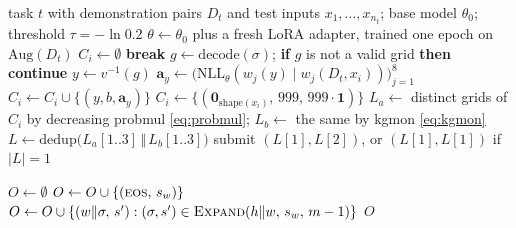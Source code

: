 \documentclass[11pt]{article}
\newcommand{\code}[1]{\texttt{#1}}
\newcommand{\R}[1]{R#1}
\begin{document}
\begin{algorithm}[t]
\caption{The NVARC-derived solver for one task, as run in our notebooks (code of \R{2}). In the code, the batches of different test inputs of a task are interleaved.}
\label{alg:solver}
\begin{algorithmic}[1]
\Require task $t$ with demonstration pairs $D_t$ and test inputs $x_1,\dots,x_{n_t}$; base model $\theta_0$; threshold $\tau=-\ln 0.2$
\State $\theta \gets \theta_0$ plus a fresh LoRA adapter, trained one epoch on $\mathrm{Aug}(D_t)$ 
  \State $C_i \gets \emptyset$ 
   
     \textbf{break} \EndIf
     
      \State $g \gets \mathrm{decode}(\sigma)$; \textbf{if} $g$ is not a valid grid \textbf{then continue}
      \State $y \gets v^{-1}(g)$ 
        \State $\mathbf{a}_y \gets \big(\mathrm{NLL}_\theta(w_j(y) \mid w_j(D_t, x_i))\big)_{j=1}^{8}$ 
      \EndIf
      \State $C_i \gets C_i \cup \{(y, b, \mathbf{a}_y)\}$
    \EndFor
  \EndFor
   $C_i \gets \{(\mathbf{0}_{\mathrm{shape}(x_i)},\, 999,\, 999\cdot\mathbf{1})\}$  \EndIf
  \State $L_a \gets$ distinct grids of $C_i$ by decreasing probmul \eqref{eq:probmul}; $L_b \gets$ the same by kgmon \eqref{eq:kgmon}
  \State $L \gets \mathrm{dedup}\big(L_a[1..3] \,\Vert\, L_b[1..3]\big)$
  \State submit $(L[1], L[2])$, or $(L[1], L[1])$ if $|L| = 1$ 
\EndFor
\end{algorithmic}
\end{algorithm}

\begin{algorithm}[t]
\caption{Thresholded depth-first search (\code{turbo\_dfs}) for one view. In the code, the views of a batch are searched together, and a call stops after 540\,s. $K$ is 10 in \R{2} and 5 in the other full runs; it never binds (\cref{sec:pipeline}).}
\label{alg:dfs}
\begin{algorithmic}[1]
  \State \Return {} 
\EndFunction
{} 
  \State $O \gets \emptyset$
      \State $O \gets O \cup \{(\textsc{eos},\, s_w)\}$
      \State $O \gets O \cup \{(w \Vert \sigma,\, s') : (\sigma, s') \in \Call{Expand}{h \Vert w,\, s_w,\, m-1}\}$
    \EndIf
  \EndFor
  \State \Return $O$
\EndFunction
\end{algorithmic}
\end{algorithm}
\end{document}

